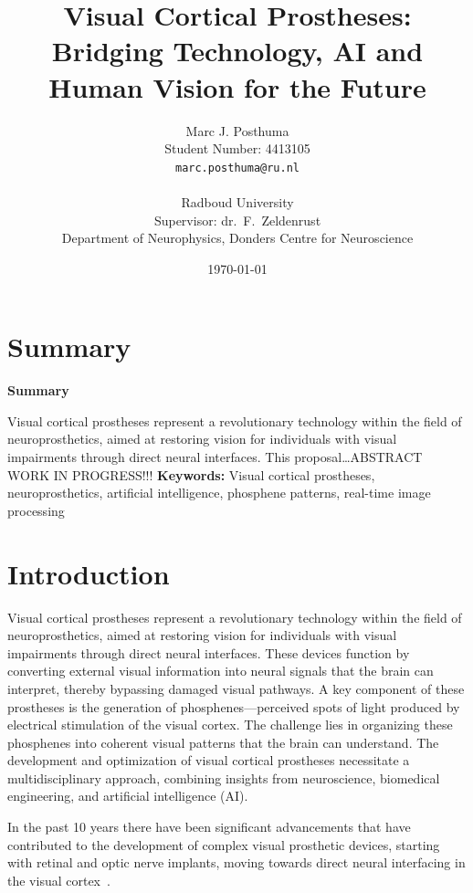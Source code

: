 \documentclass[10pt]{article}
\title{Visual Cortical Prostheses: Bridging Technology, AI and Human Vision for the Future}
\author{
  Marc J. Posthuma\\
  Student Number: 4413105\\
  \texttt{marc.posthuma@ru.nl}\\
  \\
  Radboud University\\
  Supervisor: dr.\ F.\ Zeldenrust\\
  Department of Neurophysics, Donders Centre for Neuroscience
}
\date{\today}
\makeatletter
\renewenvironment{abstract}{%
    \if@twocolumn%
      \section*{\abstractname}%
    \else
      \begin{center}%
        {\bfseries \large\abstractname\vspace{-.5em}\vspace{\z@}}%
      \end{center}%
      \quotation\small %
    \fi}
    {\if@twocolumn\else\endquotation\fi}%
\renewcommand{\abstractname}{Summary}
\makeatother
\begin{document}
\pagestyle{plain}%
\listoftodos%
\clearpage%

\newpage%

\maketitle
\thispagestyle{firstpage} %
\begin{abstract}
    \noindent Visual cortical prostheses represent a revolutionary technology
    within the field of neuro\-prosthetics, aimed at restoring vision for
    individuals with visual impairments through direct neural interfaces. This
    proposal\ldots ABSTRACT WORK IN PROGRESS!!!
\end{abstract}
\textbf{Keywords:} Visual cortical prostheses, neuroprosthetics, artificial intelligence, phosphene patterns, real-time image processing
\vspace{1cm}

\thispagestyle{firstpage}
\section*{Introduction}\label{sec:intro}
Visual cortical prostheses represent a revolutionary technology within the field
of neuroprosthetics, aimed at restoring vision for individuals with visual
impairments through direct neural interfaces. These devices function by
converting external visual information into neural signals that the brain can
interpret, thereby bypassing damaged visual pathways. A key component of these
prostheses is the generation of phosphenes—perceived spots of light produced by
electrical stimulation of the visual cortex. The challenge lies in organizing
these phosphenes into coherent visual patterns that the brain can understand.
The development and optimization of visual cortical prostheses necessitate a
multidisciplinary approach, combining insights from neuroscience, biomedical
engineering, and artificial intelligence (AI).

In the past 10 years there have been significant advancements that have
contributed to the development of complex visual prosthetic devices, starting
with retinal and optic nerve implants, moving towards direct neural interfacing
in the visual
cortex~\parencite{deruytervansteveninckRealworldIndoorMobility2022}.
\end{document}
